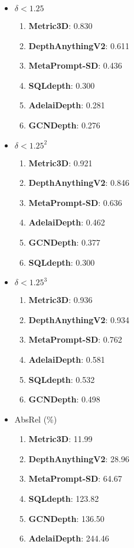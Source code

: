 \begin{itemize}
    \item $\delta < 1.25$
    \begin{enumerate}
        \item \textbf{Metric3D}: 0.830
        \item \textbf{DepthAnythingV2}: 0.611
        \item \textbf{MetaPrompt-SD}: 0.436
        \item \textbf{SQLdepth}: 0.300
        \item \textbf{AdelaiDepth}: 0.281
        \item \textbf{GCNDepth}: 0.276
    \end{enumerate}

    \item $\delta < 1.25^2$
    \begin{enumerate}
        \item \textbf{Metric3D}: 0.921
        \item \textbf{DepthAnythingV2}: 0.846
        \item \textbf{MetaPrompt-SD}: 0.636
        \item \textbf{AdelaiDepth}: 0.462
        \item \textbf{GCNDepth}: 0.377
        \item \textbf{SQLdepth}: 0.300
    \end{enumerate}

    \item $\delta < 1.25^3$
    \begin{enumerate}
        \item \textbf{Metric3D}: 0.936
        \item \textbf{DepthAnythingV2}: 0.934
        \item \textbf{MetaPrompt-SD}: 0.762
        \item \textbf{AdelaiDepth}: 0.581
        \item \textbf{SQLdepth}: 0.532
        \item \textbf{GCNDepth}: 0.498
    \end{enumerate}

    \item AbsRel (\%)
    \begin{enumerate}
        \item \textbf{Metric3D}: 11.99
        \item \textbf{DepthAnythingV2}: 28.96
        \item \textbf{MetaPrompt-SD}: 64.67
        \item \textbf{SQLdepth}: 123.82
        \item \textbf{GCNDepth}: 136.50
        \item \textbf{AdelaiDepth}: 244.46
    \end{enumerate}


\end{itemize}
